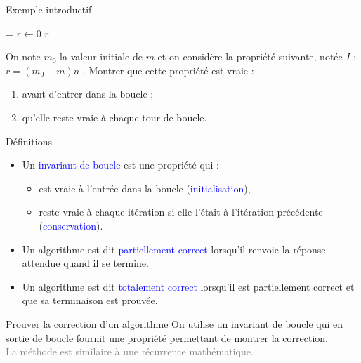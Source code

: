 \documentclass[10pt,french]{beamer}
\begin{document}
\begin{frame}[fragile]{\Ctitle}{\stitle}
	\begin{block}{Exemple introductif}
	\SetAlFnt{\small}
	\setlength{\algomargin}{8pt}
	\begin{algorithm}[H]
		\DontPrintSemicolon
		\caption{Multiplier sans utiliser {\tt *}}
		\everypar={\footnotesize \textcolor{gray}{\nl}}
		$r \leftarrow 0$\;
		\Return $r$
	  \end{algorithm}
	  On note $m_0$ la valeur initiale de $m$ et on considère la propriété suivante, notée $I$ : \og{} $r = (m_0-m)n$ \fg{}. Montrer que cette propriété est vraie :
	  \begin{enumerate}
	  \item<2-> avant d'entrer dans la boucle ;
	  \item<3-> qu'elle reste vraie à chaque tour de boucle.
	  \end{enumerate}
	\end{block}
\end{frame}

\begin{frame}[fragile]{\Ctitle}{\stitle}
	\begin{block}{Définitions}
    \begin{itemize}
        \item<1-> Un \textcolor{blue}{invariant de boucle} est une propriété qui :
            \begin{itemize}
            \item<2-> est vraie à l'entrée dans la boucle (\textcolor{blue}{initialisation}),
            \item<3-> reste vraie à chaque itération si elle l'était à l'itération précédente (\textcolor{blue}{conservation}).
            \end{itemize}
		\item<4-> Un algorithme est dit \textcolor{blue}{partiellement correct} lorsqu'il renvoie la réponse attendue quand il se termine.
		\item<5-> Un algorithme est dit \textcolor{blue}{totalement correct} lorsqu'il est partiellement correct et que sa terminaison est prouvée.
		\end{itemize}
	\end{block}
	{\begin{alertblock}{\textcolor{yellow}{\important \;} Prouver la correction d'un algorithme}
		On utilise un invariant de boucle qui en sortie de boucle fournit une propriété permettant de montrer la correction.\\
		\textcolor{gray}{La méthode est similaire à une récurrence mathématique.}
	\end{alertblock}}
\end{frame}
\end{document}
